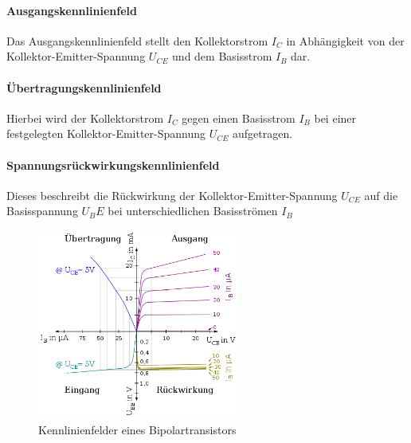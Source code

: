 	\paragraph{Ausgangskennlinienfeld} Das Ausgangskennlinienfeld stellt den Kollektorstrom $I_C$ in Abhängigkeit von der Kollektor-Emitter-Spannung $U_{CE}$ und dem Basisstrom $I_B$ dar.
	\paragraph{Übertragungskennlinienfeld} Hierbei wird der Kollektorstrom $I_C$ gegen einen Basisstrom $I_B$ bei einer festgelegten Kollektor-Emitter-Spannung $U_{CE}$ aufgetragen.
	\paragraph{Spannungsrückwirkungskennlinienfeld} Dieses beschreibt die Rückwirkung der Kollektor-Emitter-Spannung $U_{CE}$ auf die Basisspannung $U_BE$ bei unterschiedlichen Basisströmen $I_B$
	\begin{figure}[h]
		\centering
		\includegraphics[width=0.6\textwidth]{Kapitel/Kap10/kennlinien.png}
		\caption{Kennlinienfelder eines Bipolartransistors}
		\label{10_kennlinie}
	\end{figure}
	  
